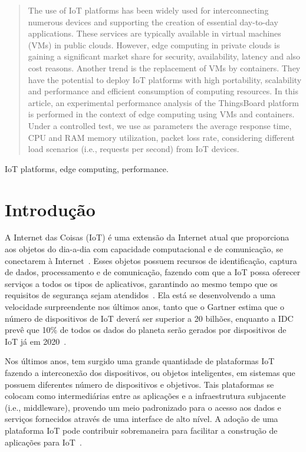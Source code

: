 \documentclass{sbrt}
\begin{document}
\begin{abstract}
The use of IoT platforms has been widely used for interconnecting numerous devices and supporting the creation of essential day-to-day applications. These services are typically available in virtual machines (VMs) in public clouds. However, edge computing in private clouds is gaining a significant market share for security, availability, latency and also cost reasons. Another trend is the replacement of VMs by containers. They have the potential to deploy IoT platforms with high portability, scalability and performance and efficient consumption of computing resources. In this article, an experimental performance analysis of the ThingsBoard platform is performed in the context of edge computing using VMs and containers. Under a controlled test, we use as parameters the average response time, CPU and RAM memory utilization, packet loss rate, considering different load scenarios (i.e., requests per second) from IoT devices.
\end{abstract}
\begin{keywords}
IoT platforms, edge computing, performance.
\end{keywords}



\section{Introdução}

A Internet das Coisas (IoT) é uma extensão da Internet atual que proporciona aos objetos do dia-a-dia com capacidade computacional e de comunicação, se conectarem à Internet~\cite{santos2016}. Esses objetos possuem recursos de identificação, captura de dados, processamento e de comunicação, fazendo  com que a IoT possa oferecer serviços a todos os tipos de aplicativos, garantindo ao mesmo tempo que os requisitos de segurança sejam atendidos~\cite{kurakova2013overview}. Ela está se desenvolvendo a uma velocidade surpreendente nos últimos anos, tanto que o Gartner estima que o número de dispositivos de IoT deverá ser superior a 20 bilhões, enquanto a IDC prevê que 10{\%} de todos os dados do planeta serão gerados por dispositivos de IoT já em 2020~\cite{wang2018prsfc}.

Nos últimos anos, tem surgido uma grande quantidade de plataformas IoT fazendo a interconexão dos dispositivos, ou objetos inteligentes, em sistemas que possuem diferentes número de dispositivos e objetivos. Tais plataformas se colocam como intermediárias entre as aplicações e a infraestrutura subjacente (i.e., middleware), provendo um meio padronizado para o acesso aos dados e serviços fornecidos através de uma interface de alto nível. A adoção de uma plataforma IoT pode contribuir sobremaneira para facilitar a construção de aplicações para IoT~\cite{mineraud2016gap}.
\end{document}
